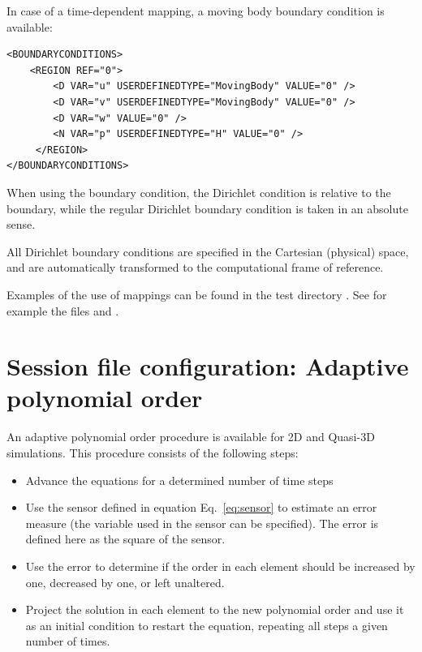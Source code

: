 In case of a time-dependent mapping, a moving body boundary condition
is available: 
\begin{lstlisting}[style=XMLStyle]
<BOUNDARYCONDITIONS>
    <REGION REF="0">
        <D VAR="u" USERDEFINEDTYPE="MovingBody" VALUE="0" />
        <D VAR="v" USERDEFINEDTYPE="MovingBody" VALUE="0" />
        <D VAR="w" VALUE="0" />
        <N VAR="p" USERDEFINEDTYPE="H" VALUE="0" />
     </REGION>
</BOUNDARYCONDITIONS>
\end{lstlisting}
When using the  boundary condition, the Dirichlet condition
is relative to the boundary, while the regular Dirichlet boundary condition
is taken in an absolute sense. 

All Dirichlet boundary conditions are specified in the Cartesian (physical) space,
 and are automatically transformed to the computational frame of reference. 
 
\begin{notebox}
Examples of the use of mappings can be found in the test directory
. See for example the files
 and .
\end{notebox}

\section{Session file configuration: Adaptive polynomial order}
\label{SectionDriverAdaptive}

An adaptive polynomial order procedure is available for 2D and
Quasi-3D simulations.  This procedure consists of the following steps:
\begin{itemize}
\item Advance the equations for a determined number of time steps
\item Use the sensor defined in equation Eq.~\eqref{eq:sensor} to 
estimate an error measure (the variable used in the sensor can be specified).
 The error is defined here as the square of the sensor.  
\item Use the error to determine if the order in each element should be
increased by one, decreased by one, or left unaltered.
\item Project the solution in each element to the new polynomial order and use it as an
initial condition to restart the equation, repeating all steps a given number of times.
\end{itemize}

